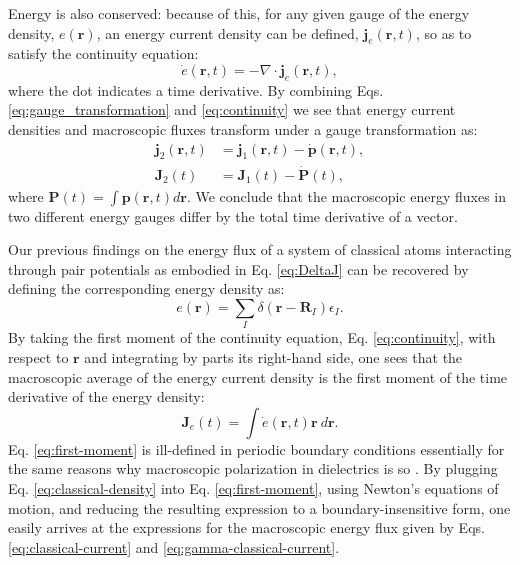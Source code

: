Energy is also conserved: because of this, for any given gauge of
the energy density, $e(\mathbf{r})$, an energy current density can
be defined, $\mathbf{j}_{e}(\mathbf{r},t)$, so as to satisfy the
continuity equation:
\begin{equation}
  \dot{e}(\mathbf{r},t)=-\nabla\cdot
  \mathbf{j}_{e}(\mathbf{r},t), \label{eq:continuity} 
\end{equation}
where the dot indicates a time derivative. By combining
Eqs. \eqref{eq:gauge_transformation} and \eqref{eq:continuity} we see
that energy current densities and macroscopic fluxes transform under a
gauge transformation as:
\begin{align}
  \mathbf{j}_{2}(\mathbf{r},t) & = \mathbf{j}_{1}(\mathbf{r},t)-
                                 \dot{\mathbf{p}}(\mathbf{r},t), \label{eq:current_density_gauge} \\
  \mathbf{J}_{2}(t) & = \mathbf{J}_{1}(t)-\dot{\mathbf{P}}(t), \label{eq:macroscopic_flux_gauge}
\end{align}
where $\mathbf{P}(t)=\int\mathbf{p}(\mathbf{r},t)d\mathbf{r}$. We
conclude that the macroscopic energy fluxes in two different energy
gauges differ by the total time derivative of a vector.

Our previous findings on the energy flux of a system of classical
atoms interacting through pair potentials as embodied in
Eq. \eqref{eq:DeltaJ} can be recovered by defining the corresponding
energy density as:
\begin{equation}
  e(\mathbf{r})=\sum_I \delta(\mathbf{r}-\mathbf{R}_I)
  \epsilon_I \label{eq:classical-density}.
\end{equation} 
By taking the first moment of the continuity equation,
Eq. \eqref{eq:continuity}, with respect to $\mathbf{r}$ and
integrating by parts its right-hand side, one sees that the
macroscopic average of the energy current density is the first moment
of the time derivative of the energy density:
\begin{equation}
  \mathbf{J}_e(t)=\int \dot e(\mathbf{r},t) \mathbf{r}
  ~d\mathbf{r}. \label{eq:first-moment} 
\end{equation}
Eq. \eqref{eq:first-moment} is ill-defined in periodic boundary
conditions essentially for the same reasons why macroscopic
polarization in dielectrics is so \cite{Resta:2007}. By plugging
Eq. \eqref{eq:classical-density} into Eq. \eqref{eq:first-moment},
using Newton's equations of motion, and reducing the resulting
expression to a boundary-insensitive form, one easily arrives at the
expressions for the macroscopic energy flux given by
Eqs.  \eqref{eq:classical-current}  and \eqref{eq:gamma-classical-current}.

